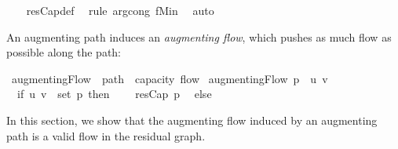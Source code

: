 \begin{isabellebody}
{}
\isanewline
%
\isadelimproof
\ \ %
\endisadelimproof
%
\isatagproof
{}\isamarkupfalse%
\ resCap{\isacharunderscore}def\ \isamarkupfalse%
\ {\isacharparenleft}rule\ arg{\isacharunderscore}cong{\isacharbrackleft}\ f{\isacharequal}Min{\isacharbrackright}{\isacharparenright}\ \isamarkupfalse%
\ auto%
\endisatagproof
{\isafoldproof}%
%
\isadelimproof
%
\endisadelimproof
%
\begin{isamarkuptext}%
An augmenting path induces an \emph{augmenting flow}, which pushes as 
  much flow as possible along the path:%
\end{isamarkuptext}\isamarkuptrue%
\isamarkupfalse%
\ augmentingFlow\ {\isacharcolon}{\isacharcolon}\ {\isachardoublequoteopen}path\ {\isasymRightarrow}\ {\isacharprime}capacity\ flow{\isachardoublequoteclose}\isanewline
{}\ {\isachardoublequoteopen}augmentingFlow\ p\ {\isasymequiv}\ {\isasymlambda}{\isacharparenleft}u{\isacharcomma}\ v{\isacharparenright}{\isachardot}\isanewline
\ \ if\ {\isacharparenleft}u{\isacharcomma}\ v{\isacharparenright}\ {\isasymin}\ {\isacharparenleft}set\ p{\isacharparenright}\ then\isanewline
\ \ \ \ resCap\ p\isanewline
\ \ else\isanewline
\ \ \ \ {}{\isachardoublequoteclose}%
\isamarkuptrue%
%
\begin{isamarkuptext}%
In this section, we show that the augmenting flow induced by an 
  augmenting path is a valid flow in the residual graph.


\end{isamarkuptext}
\end{isabellebody}

